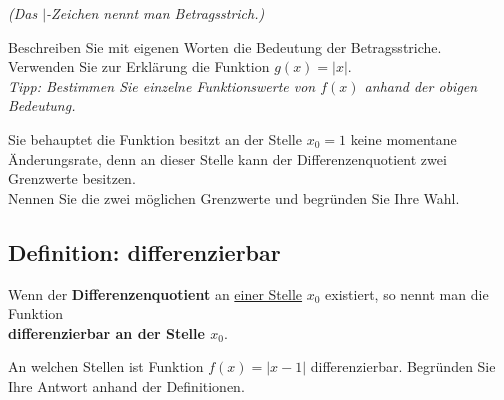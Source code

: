 			\textit{(Das $\vert$-Zeichen nennt man Betragsstrich.)}
			\begin{enumerate}[a)]
				\begin{minipage}{0.7\textwidth}
						\item Beschreiben Sie mit eigenen Worten die Bedeutung der Betragsstriche. Verwenden Sie zur Erklärung die Funktion $g(x)=\left\vert x\right\vert$.\\ 
						
						\textit{Tipp: Bestimmen Sie einzelne Funktionswerte von $f(x)$ anhand der obigen Bedeutung.}
						\item Sie behauptet die Funktion besitzt an der Stelle $x_0=1$ keine momentane Änderungsrate, denn an dieser Stelle kann der Differenzenquotient zwei Grenzwerte besitzen.\\
						
						Nennen Sie die zwei möglichen Grenzwerte und begründen Sie Ihre Wahl. 
				\end{minipage}%
				\begin{minipage}{0.3\textwidth}
				\end{minipage}
			\end{enumerate}\vspace{-0.4cm}
		\subsection*{Definition: differenzierbar}
			\begin{tcolorbox}
				Wenn der \textbf{Differenzenquotient} an \underline{einer Stelle} $x_0$ existiert, so nennt man die Funktion\\
				
				\textbf{differenzierbar an der Stelle $x_0$}.
			\end{tcolorbox}
			 An welchen Stellen ist Funktion $f(x)=\left\vert x-1\right\vert$ differenzierbar. Begründen Sie Ihre Antwort anhand der Definitionen.\vspace{-0.3cm}
